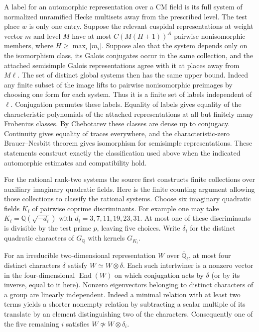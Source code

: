A label for an automorphic representation over a CM field is its
full system of normalized unramified Hecke multisets away from
the prescribed level. The test place \(w\) is only one entry.
Suppose the relevant cuspidal representations at weight vector
\(m\) and level \(M\) have at most \(C(M(H+1))^A\) pairwise
nonisomorphic members, where \(H\ge\max_i|m_i|\). Suppose also
that the system depends only on the isomorphism class, its Galois
conjugates occur in the same collection, and the attached
semisimple Galois representations agree with it at places
away from \(M\ell\). The set of distinct global systems then has
the same upper bound. Indeed any finite subset of the image lifts
to pairwise nonisomorphic preimages by choosing one form for each
system. Thus it is a finite set of labels independent of \(\ell\).
Conjugation permutes these labels. Equality of labels gives equality
of the characteristic polynomials of the attached representations
at all but finitely many Frobenius classes. By Chebotarev these
classes are dense up to conjugacy. Continuity gives equality of
traces everywhere, and the characteristic-zero Brauer--Nesbitt
theorem gives isomorphism for semisimple representations.
These statements construct exactly the classification used above
when the indicated automorphic estimates and compatibility hold.

For the rational rank-two systems the source first constructs
finite collections over auxiliary imaginary quadratic fields. Here
is the finite counting argument allowing those collections to
classify the rational systems. Choose six imaginary quadratic
fields \(K_i\) of pairwise coprime discriminants. For example
one may take \(K_i=\mathbb Q(\sqrt{-d_i})\) with
\(d_i=3,7,11,19,23,31\). At most one of these discriminants is
divisible by the test prime \(p\), leaving five choices. Write
\(\delta_i\) for the distinct quadratic characters of
\(G_{\mathbb Q}\) with kernels \(G_{K_i}\).

For an irreducible two-dimensional representation \(W\) over
\(\overline{\mathbb Q}_\ell\), at most four distinct characters
\(\delta\) satisfy \(W\simeq W\otimes\delta\). Each such
intertwiner is a nonzero vector in the four-dimensional
\(\operatorname{End}(W)\) on which conjugation acts by
\(\delta\) (or by its inverse, equal to it here). Nonzero
eigenvectors belonging to distinct characters of a group are
linearly independent. Indeed a minimal relation with at least
two terms yields a shorter nonempty relation by subtracting a
scalar multiple of its translate by an element distinguishing
two of the characters. Consequently one of the five remaining
\(i\) satisfies \(W\not\simeq W\otimes\delta_i\).


